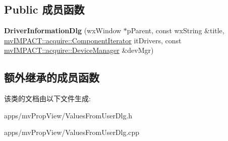 \subsection*{Public 成员函数}
\begin{DoxyCompactItemize}
\item 
\hypertarget{class_driver_information_dlg_a1b34310b009fb9b5e6f4f104ef0fabe6}{{\bfseries Driver\+Information\+Dlg} (wx\+Window $\ast$p\+Parent, const wx\+String \&title, \hyperlink{group___common_interface_ga461a5ba2197d9e599ee35e2514d684ef}{mv\+I\+M\+P\+A\+C\+T\+::acquire\+::\+Component\+Iterator} it\+Drivers, const \hyperlink{classmv_i_m_p_a_c_t_1_1acquire_1_1_device_manager}{mv\+I\+M\+P\+A\+C\+T\+::acquire\+::\+Device\+Manager} \&dev\+Mgr)}\label{class_driver_information_dlg_a1b34310b009fb9b5e6f4f104ef0fabe6}

\end{DoxyCompactItemize}
\subsection*{额外继承的成员函数}


该类的文档由以下文件生成\+:\begin{DoxyCompactItemize}
\item 
apps/mv\+Prop\+View/Values\+From\+User\+Dlg.\+h\item 
apps/mv\+Prop\+View/Values\+From\+User\+Dlg.\+cpp\end{DoxyCompactItemize}

